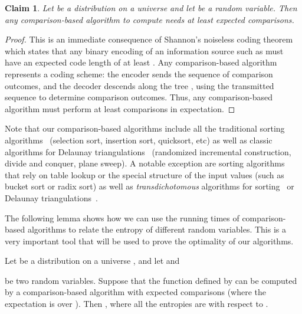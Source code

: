 \documentclass{siamltex}
\newtheorem{claim}[theorem]{Claim}
\begin{document}
\begin{claim}\label{clm:entropy-lower}
Let  be a distribution on a universe  and let 
 be a random variable. Then any
comparison-based algorithm to compute  needs 
at least  expected comparisons.
\end{claim}
\begin{proof}
This is an immediate consequence of Shannon's noiseless coding 
theorem~\cite[Theorem~5.4.1]{CoverTh06}
which states that any binary encoding
of an information source such as  must have an expected
code length of at least . Any comparison-based algorithm 
represents a coding scheme: the encoder sends the sequence of comparison
outcomes, and the decoder descends along the tree , using the transmitted
sequence to determine comparison outcomes. Thus, any comparison-based
algorithm must perform at least  comparisons in expectation. 
\end{proof}
\medskip

Note that our comparison-based algorithms include all the 
traditional sorting algorithms~\cite{CormenLeRiSt09} (selection sort, 
insertion sort, quicksort, etc) as well as classic algorithms
for Delaunay triangulations~\cite{deBergKrOvSc00}
(randomized incremental construction, divide and conquer, plane sweep).
A notable exception are sorting algorithms that rely on table lookup
or the special structure of the input values (such as bucket sort or radix 
sort) as well as \emph{transdichotomous} algorithms for 
sorting~\cite{Han04,HanTh02} or Delaunay 
triangulations~\cite{BuchinMu09,ChanPa07,ChanPa09}.

The following lemma
shows how we can use the running times of comparison-based algorithms
to relate the entropy of different random variables. 
This is a very important tool that will be used to 
prove the optimality of our algorithms.
\medskip
\begin{lemma}\label{lem:relate-entropy}
Let  be a distribution on a universe , and let
 and 

be two random variables. Suppose that the function 
 defined by 
can be computed by a comparison-based algorithm
with  expected comparisons (where the expectation is over ). 
Then , where all the entropies 
are with respect to .
\end{lemma}
\end{document}
